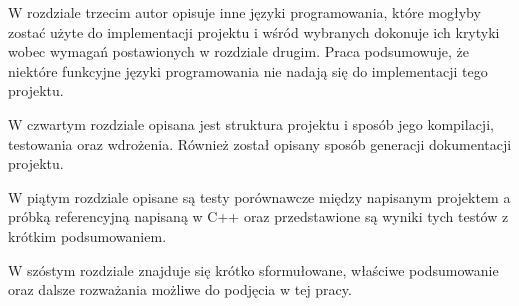 \documentclass[../../praca.tex]{subfiles}
\begin{document}
W rozdziale trzecim autor opisuje inne języki programowania, które mogłyby
zostać użyte do implementacji projektu i wśród wybranych dokonuje ich krytyki
wobec wymagań postawionych w rozdziale drugim. Praca podsumowuje, że niektóre
funkcyjne języki programowania nie nadają się do implementacji tego projektu.

W czwartym rozdziale opisana jest struktura projektu i sposób jego kompilacji, testowania
oraz wdrożenia. Również został opisany sposób generacji dokumentacji projektu.

W piątym rozdziale opisane są testy porównawcze między napisanym projektem a próbką 
referencyjną napisaną w C++ oraz przedstawione są wyniki tych testów z krótkim 
podsumowaniem.

W szóstym rozdziale znajduje się krótko sformułowane, właściwe podsumowanie oraz dalsze
rozważania możliwe do podjęcia w tej pracy.
\end{document}
